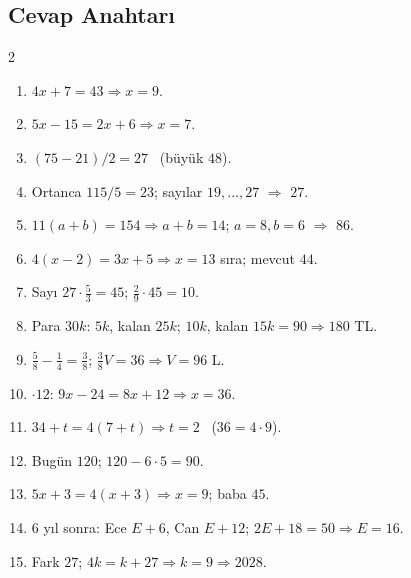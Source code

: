 \subsection*{Cevap Anahtarı}
{\small
\begin{multicols}{2}
\begin{enumerate}[label=\textbf{\arabic*.},leftmargin=*,itemsep=1pt]
\item \(4x+7=43\Rightarrow x=9\).
\item \(5x-15=2x+6\Rightarrow x=7\).
\item \((75-21)/2=27\) \ (büyük \(48\)).
\item Ortanca \(115/5=23\); sayılar \(19,\dots,27\) \(\Rightarrow\) \(27\).
\item \(11(a+b)=154\Rightarrow a+b=14\); \(a=8,b=6\) \(\Rightarrow\) \(86\).
\item \(4(x-2)=3x+5\Rightarrow x=13\) sıra; mevcut \(44\).
\item Sayı \(27\cdot\frac{5}{3}=45\); \(\frac{2}{9}\cdot 45=10\).
\item Para \(30k\): \(5k\), kalan \(25k\); \(10k\), kalan \(15k=90\Rightarrow 180\) TL.
\item \(\frac{5}{8}-\frac{1}{4}=\frac{3}{8}\); \(\frac{3}{8}V=36\Rightarrow V=96\) L.
\item \(\cdot 12\): \(9x-24=8x+12\Rightarrow x=36\).
\item \(34+t=4(7+t)\Rightarrow t=2\) \ (\(36=4\cdot 9\)).
\item Bugün \(120\); \(120-6\cdot 5=90\).
\item \(5x+3=4(x+3)\Rightarrow x=9\); baba \(45\).
\item \(6\) yıl sonra: Ece \(E+6\), Can \(E+12\); \(2E+18=50\Rightarrow E=16\).
\item Fark \(27\); \(4k=k+27\Rightarrow k=9\Rightarrow 2028\).
\end{enumerate}
\end{multicols}}

